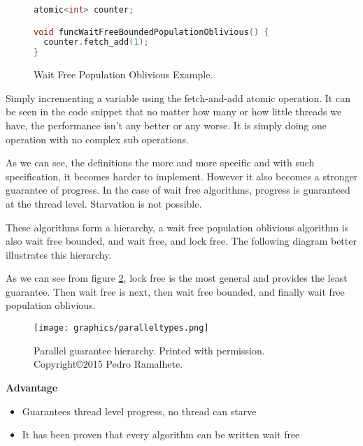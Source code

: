 \documentclass[letterpaper, 12pt]{article}
\begin{document}
\begin{figure}[H]
\begin{lstlisting}[language=C++]
atomic<int> counter;

void funcWaitFreeBoundedPopulationOblivious() {
  counter.fetch_add(1);
}
\end{lstlisting} 
\caption{Wait Free Population Oblivious Example.\cite{concurrencyfreaks}} \label{wfpo_ex}
\end{figure}

Simply incrementing a variable using the fetch-and-add atomic operation. It can be seen in the code snippet that no 
matter how many or how little threads we have, the performance isn't any better or any worse. 
It is simply doing one operation with no complex sub operations.
\par\vspace{\baselineskip}

As we can see, the definitions the more and more specific and with such specification, it becomes 
harder to implement. However it also becomes a stronger guarantee of progress. In the case of 
wait free algorithms, progress is guaranteed at the thread level. Starvation is not possible.
\par\vspace{\baselineskip}

These algorithms form a hierarchy, a wait free population oblivious algorithm is also wait 
free bounded, and wait free, and lock free. The following diagram better illustrates 
this hierarchy.
\par\vspace{\baselineskip}

As we can see from figure \ref{paralleltypes}, lock free is the most general and provides the least guarantee. Then 
wait free is next, then wait free bounded, and finally wait free population oblivious.
\par\vspace{\baselineskip}

\begin{figure}[H]
  \centering
  \texttt{[image: graphics/paralleltypes.png]}
  \caption{Parallel guarantee hierarchy. Printed with permission. \newline Copyright\copyright 2015 Pedro Ramalhete.\citep{concurrencyfreaks}}
  \label{paralleltypes}
\end{figure}

{\bfseries Advantage}
\par\vspace{\baselineskip}
\begin{itemize}
	\item Guarantees thread level progress, no thread can starve
	\item It has been proven that every algorithm can be written wait free
\end{itemize}
\end{document}
